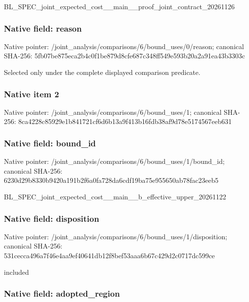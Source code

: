 \documentclass[10pt,a4paper]{article}
\begin{document}
BL\_SPEC\_joint\_expected\_c\allowbreak{}ost\_\_main\_\_proof\_joint\_c\allowbreak{}ontract\_20261126


\subsubsection{Native field: reason}


Native pointer: /joint\_analysis/comparis\allowbreak{}ons/6/bound\_uses/0/reaso\allowbreak{}n; canonical SHA-256: 5fb07be875eca2b4c0f1be87\allowbreak{}9d8cfe687c348ff549e593b2\allowbreak{}0a2a91ea43b3303c


Selected only under the complete displayed comparison predicate.


\subsubsection{Native item 2}


Native pointer: /joint\_analysis/comparis\allowbreak{}ons/6/bound\_uses/1; canonical SHA-256: 8ca4228c85929e1b841721cf\allowbreak{}6d6b13a9f413b16fdb38af9d\allowbreak{}78e5174567eeb631



\subsubsection{Native field: bound\_id}


Native pointer: /joint\_analysis/comparis\allowbreak{}ons/6/bound\_uses/1/bound\allowbreak{}\_id; canonical SHA-256: 6230d29b8330b9420a191b2f\allowbreak{}6a0fa728da6cdf19ba75e955\allowbreak{}650ab78fac23eeb5


BL\_SPEC\_joint\_expected\_c\allowbreak{}ost\_\_main\_\_b\_effective\_u\allowbreak{}pper\_20261122


\subsubsection{Native field: disposition}


Native pointer: /joint\_analysis/comparis\allowbreak{}ons/6/bound\_uses/1/dispo\allowbreak{}sition; canonical SHA-256: 531cecca496a7f46e4aa9ef4\allowbreak{}0641db12f8bef53aaa6b67c4\allowbreak{}29d2c0717dc599ce


included


\subsubsection{Native field: adopted\_region}
\end{document}
